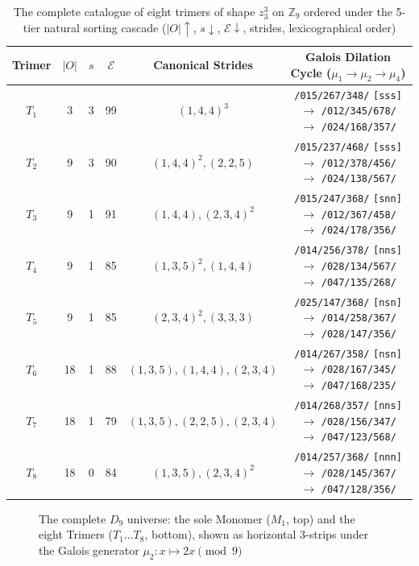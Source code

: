 \begin{table}[htbp]
\centering
\footnotesize
\setlength{\tabcolsep}{4.5pt}
\begin{tabular}{cccccc}
\toprule
\textbf{Trimer} & \textbf{$|O|$} & \textbf{$s$} & \textbf{$\mathcal{E}$} & \textbf{Canonical Strides} & \textbf{Galois Dilation Cycle ($\mu_1 \to \mu_2 \to \mu_4$)} \\
\midrule
$T_1$ & 3  & 3 & 99 & $(1, 4, 4)^3$ & \texttt{/015/267/348/} \texttt{[sss]} $\to$ \texttt{/012/345/678/} $\to$ \texttt{/024/168/357/} \\
$T_2$ & 9  & 3 & 90 & $(1, 4, 4)^2, (2, 2, 5)$ & \texttt{/015/237/468/} \texttt{[sss]} $\to$ \texttt{/012/378/456/} $\to$ \texttt{/024/138/567/} \\
$T_3$ & 9  & 1 & 91 & $(1, 4, 4), (2, 3, 4)^2$ & \texttt{/015/247/368/} \texttt{[snn]} $\to$ \texttt{/012/367/458/} $\to$ \texttt{/024/178/356/} \\
$T_4$ & 9  & 1 & 85 & $(1, 3, 5)^2, (1, 4, 4)$ & \texttt{/014/256/378/} \texttt{[nns]} $\to$ \texttt{/028/134/567/} $\to$ \texttt{/047/135/268/} \\
$T_5$ & 9  & 1 & 85 & $(2, 3, 4)^2, (3, 3, 3)$ & \texttt{/025/147/368/} \texttt{[nsn]} $\to$ \texttt{/014/258/367/} $\to$ \texttt{/028/147/356/} \\
$T_6$ & 18 & 1 & 88 & $(1, 3, 5), (1, 4, 4), (2, 3, 4)$ & \texttt{/014/267/358/} \texttt{[nsn]} $\to$ \texttt{/028/167/345/} $\to$ \texttt{/047/168/235/} \\
$T_7$ & 18 & 1 & 79 & $(1, 3, 5), (2, 2, 5), (2, 3, 4)$ & \texttt{/014/268/357/} \texttt{[nns]} $\to$ \texttt{/028/156/347/} $\to$ \texttt{/047/123/568/} \\
$T_8$ & 18 & 0 & 84 & $(1, 3, 5), (2, 3, 4)^2$ & \texttt{/014/257/368/} \texttt{[nnn]} $\to$ \texttt{/028/145/367/} $\to$ \texttt{/047/128/356/} \\
\bottomrule
\end{tabular}
\caption{\label{tab:d9-trimers}The complete catalogue of eight trimers of shape $z_3^3$ on $\mathbb{Z}_9$ ordered under the 5-tier natural sorting cascade ($|O| \uparrow$, $s \downarrow$, $\mathcal{E} \downarrow$, strides, lexicographical order)}
\end{table}

\begin{figure}[p]
\centering

\caption{\label{fig:d9-universe}The complete $D_9$ universe: the sole Monomer ($M_1$, top) and the eight Trimers ($T_1 \dots T_8$, bottom), shown as horizontal 3-strips under the Galois generator $\mu_2 \colon x \mapsto 2x \pmod 9$}
\end{figure}
